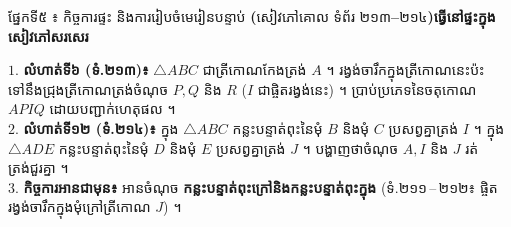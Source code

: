 \documentclass[a4paper,10pt]{article}
\newcommand{\en}[1]{{\TimesEn #1}}
\newcommand{\enbf}[1]{{\TimesEn\textbf{#1}}}
\newcommand{\tri}[1]{\ensuremath{\triangle #1}}
\newcommand{\secbar}[2]{%
  \vspace{3pt}%
  \begin{tcolorbox}[
    enhanced, sharp corners, colback=headgray, colframe=black,
    boxrule=0.9pt, boxsep=1pt, top=2.5pt, bottom=2.5pt, left=6pt, right=6pt,
    after skip=3pt
  ]
    {\muol\fontsize{9.2pt}{13.5pt}\selectfont #1}\hfill{\fontsize{8.3pt}{11.5pt}\selectfont\textbf{#2}}
  \end{tcolorbox}%
}
\begin{document}
\vspace{2pt}
\secbar{ផ្នែកទី៥ ៖ កិច្ចការផ្ទះ និងការរៀបចំមេរៀនបន្ទាប់ \enbf{(}សៀវភៅគោល ទំព័រ ២១៣\enbf{--}២១៤\enbf{)}}{ធ្វើនៅផ្ទះក្នុងសៀវភៅសរសេរ}

\begin{tcolorbox}[
  enhanced, sharp corners, colback=panelgray, colframe=black,
  boxrule=0.85pt, boxsep=2.5pt, top=3.5pt, bottom=3.5pt, left=6pt, right=6pt
]
  $1.$ \textbf{លំហាត់ទី៦ (ទំ.២១៣)៖} $\tri{ABC}$ ជាត្រីកោណកែងត្រង់ $A$ ។ រង្វង់ចារឹកក្នុងត្រីកោណនេះប៉ះទៅនឹងជ្រុងត្រីកោណត្រង់ចំណុច $P, Q$ និង $R$ ($I$ ជាផ្ចិតរង្វង់នេះ) ។ ប្រាប់ប្រភេទនៃចតុកោណ $APIQ$ ដោយបញ្ជាក់ហេតុផល ។\\[2.5pt]
  $2.$ \textbf{លំហាត់ទី១២ (ទំ.២១៤)៖} ក្នុង $\tri{ABC}$ កន្លះបន្ទាត់ពុះនៃមុំ $B$ និងមុំ $C$ ប្រសព្វគ្នាត្រង់ $I$ ។ ក្នុង $\tri{ADE}$ កន្លះបន្ទាត់ពុះនៃមុំ $D$ និងមុំ $E$ ប្រសព្វគ្នាត្រង់ $J$ ។ បង្ហាញថាចំណុច $A, I$ និង $J$ រត់ត្រង់ជួរគ្នា ។\\[2.5pt]
  $3.$ \textbf{កិច្ចការអានជាមុន៖} អានចំណុច \textbf{កន្លះបន្ទាត់ពុះក្រៅនិងកន្លះបន្ទាត់ពុះក្នុង} (ទំ.២១១\,\en{--}\,២១២៖ ផ្ចិតរង្វង់ចារឹកក្នុងមុំក្រៅត្រីកោណ $J$) ។
\end{tcolorbox}
\end{document}

